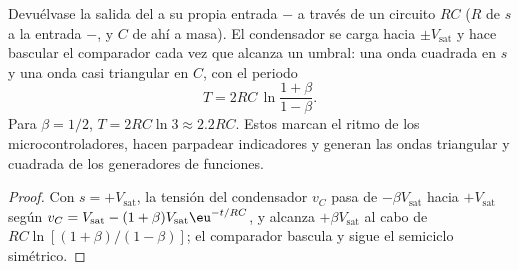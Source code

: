 \begin{proposition}\label{prop:b2:feedback-oscillators:astable}
Devuélvase la salida del  a su propia entrada $-$
a través de un circuito $RC$ ($R$ de $s$ a la entrada $-$, y $C$ de ahí a
masa). El condensador se carga hacia $\pm V_{\text{sat}}$ y hace bascular el
comparador cada vez que alcanza un umbral: una onda cuadrada en $s$ y una
onda casi triangular en $C$, con el periodo
\[
T = 2RC\,\ln\frac{1 + \beta}{1 - \beta} .
\]
Para $\beta = 1/2$, $T = 2RC\ln3 \approx 2.2RC$. Estos \emph{} marcan el ritmo de los microcontroladores, hacen parpadear
indicadores y generan las ondas triangular y cuadrada de los generadores
de funciones.
\end{proposition}

\begin{proof}
Con $s = +V_{\text{sat}}$, la tensión del condensador $v_C$ pasa de
$-\beta V_{\text{sat}}$ hacia $+V_{\text{sat}}$ según $v_C = V_{\text{sat}} - (1 + \beta)
V_{\text{sat}}\eu^{-t/RC}$, y alcanza $+\beta V_{\text{sat}}$ al cabo de $RC\ln[(1 + \beta)
/(1 - \beta)]$; el comparador bascula y sigue el semiciclo simétrico.
\end{proof}

